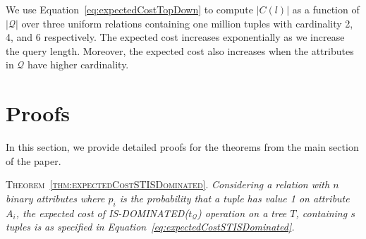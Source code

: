 We use Equation~\ref{eq:expectedCostTopDown} to compute $|C(l)|$ as a function of $|\mathcal{Q}|$ over three uniform relations containing one million tuples with cardinality 2, 4, and 6 respectively. The expected cost increases exponentially as we increase the query length. Moreover, the expected cost also increases when the attributes in $\mathcal{Q}$ have higher cardinality.



\section{Proofs}\label{sec:appendixProof}
In this section, we provide detailed proofs for the theorems from the main section of the paper.

\textsc{Theorem~\ref{thm:expectedCostSTISDominated}.} {\em
Considering a relation with $n$ binary attributes where $p_i$ is the probability that a tuple has value 1 on attribute $A_i$, the expected cost of IS-DOMINATED($t_\mathcal{Q}$) operation on a tree $T$, containing $s$ tuples is as specified in Equation~\ref{eq:expectedCostSTISDominated}.
}

